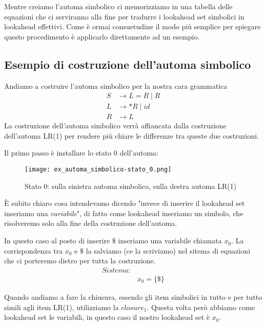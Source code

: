 \documentclass[class=book, crop=false, oneside, 12pt]{standalone}
\begin{document}
Mentre creiamo l'automa simbolico ci memorizziamo in una tabella delle equazioni che ci serviranno alla fine per tradurre i lookahead set simbolici in lookahead effettivi. Come è ormai consuetudine il modo più semplice per spiegare questo procedimento è applicarlo direttamente ad un esempio.

\subsection*{Esempio di costruzione dell'automa simbolico}
Andiamo a costruire l'automa simbolico per la nostra cara grammatica
\begin{align*}
    S &\to L = R \mid R \\
    L &\to *R \mid id \\
    R &\to L
\end{align*}
La costruzione dell'automa simbolico verrà affiancata dalla costruzione dell'automa LR(1) per rendere più chiare le differenze tra queste due costruzioni.

Il primo passo è installare lo stato 0 dell'automa:
\begin{figure}[h!]
    \centering
    \texttt{[image: ex\_automa\_simbolico-stato\_0.png]}
    \caption{Stato 0: sulla sinistra automa simbolico, sulla destra automa LR(1)}
    \label{img:ex_automa_simbolico-stato_0}
\end{figure}
È subito chiaro cosa intendevamo dicendo "invece di inserire il lookahead set inseriamo una \emph{variabile}", di fatto come lookahead inseriamo un simbolo, che risolveremo solo alla fine della costruzione dell'automa.

In questo caso al posto di inserire \(\$\) inseriamo una variabile chiamata \(x_0\).
La corrispondenza tra \(x_0\) e \(\$\) la salviamo (ce la scriviamo) nel sitema di equazioni che ci porteremo dietro per tutta la costruzione.
\begin{align*}
    Sistema:& \\
            & x_0 = \{\$\}
\end{align*}

Quando andiamo a fare la chiusura, essendo gli item simbolici in tutto e per tutto simili agli item LR(1), utilizziamo la \(closure_1\).
Questa volta però abbiamo come lookahead set le variabili, in questo caso il nostro lookahead set è \(x_0\).
\end{document}
